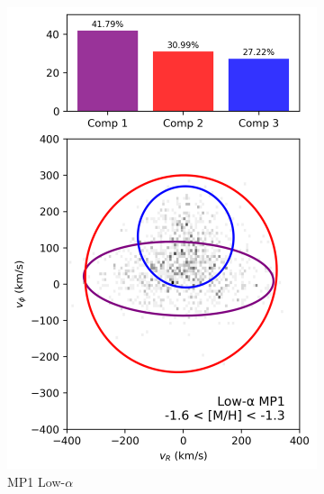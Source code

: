 \documentclass[a4paper,10pt]{article}
\begin{document}
\begin{multicols}{2}
\begin{figure}[H]
\begin{subfigure}[t]{0.24\linewidth}
    \includegraphics[width=\linewidth]{../figures/gmm_mp1_low_alpha_k4.png}
    \caption{MP1 Low-$\alpha$}
  \end{subfigure}
  \hfill
  \begin{subfigure}[t]{0.24\linewidth}

\end{subfigure}
\end{figure}
\end{multicols}
\end{document}
